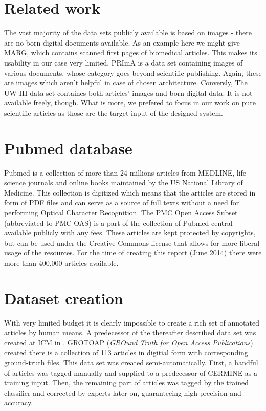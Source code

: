 \section{Related work}
The vast majority of the data sets publicly available is based on images - there are no born-digital documents available. As an example here we might give MARG, which contains scanned first pages of biomedical articles. This makes its usability in our case very limited. PRImA is a data set containing images of various documents, whose category goes beyond scientific publishing. Again, these are images which aren't helpful in case of chosen architecture. Conversly, The UW-III data set containes both articles' images and born-digital data. It is not available freely, though. What is more, we prefered to focus in our work on pure scientific articles as those are the target input of the designed system.
\section{Pubmed database}
Pubmed \cite{Pubmed} is a collection of more than 24 millions articles from MEDLINE, life science journals and online books maintained by the US National Library of Medicine. This collection is digitized which means that the articles are stored in form of PDF files and can serve as a source of full texts without a need for performing Optical Character Recognition. 
The PMC Open Access Subset (abbreviated to PMC-OAS) is a part of the collection of Pubmed central available publicly with any fees. These articles are kept protected by copyrights, but can be used under the Creative Commons license that allows for more liberal usage of the resources. For the time of creating this report (June 2014) there were more than 400,000 articles available.
\section{Dataset creation}
With very limited budget it is clearly impossible to create a rich set of annotated articles by human means. A predecessor of the thereafter described data set was created at ICM in \cite{Tkaczyk2012}. GROTOAP (\textit{GROund Truth for Open Access Publications}) created there is a collection of 113 articles in digitial form with corresponding ground-truth files. This data set was created semi-automatically. First, a handful of articles was tagged manually and supplied to a predecessor of CERMINE as a training input. Then, the remaining part of articles was tagged by the trained classifier and corrected by experts later on, guaranteeing high precision and accuracy.


